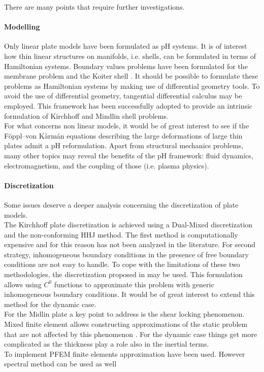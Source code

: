There are many points that require further investigations.


\paragraph{Modelling}
Only linear plate models have been formulated as pH systems. It is of interest how thin linear structures on manifolds, i.e. shells, can be formulated in terms of Hamiltonian systems. Boundary values problems have been formulated for the membrane problem and the Koiter shell \cite{ciarlet2000shells}. It should be possible to formulate these problems as Hamiltonian systems by making use of differential geometry tools. To avoid the use of differential geometry, tangential differential calculus \cite{delfour2011shapes} may be employed. This framework has been successfully adopted to provide an intrinsic formulation of Kirchhoff \cite{schollhammer2019kirchhoff} and Mindlin \cite{schollhammer2019reissner} shell problems. \\
For what concerns non linear models, it would be of great interest to see if the F\"oppl–von K\`arm\'an equations describing the large deformations of large thin plates \cite{bilbao2015conservative} admit a pH reformulation. Apart from structural mechanics problems, many other topics may reveal the benefits of the pH framework: fluid dynamics, electromagnetism, and the coupling of those (i.e. plasma physics).


\paragraph{Discretization}
Some issues deserve a deeper analysis concerning the discretization of plate models. \\
The Kirchhoff plate discretization is achieved using a Dual-Mixed discretization and the non-conforming HHJ method. The first method is computationally expensive and for this reason has not been analyzed in the literature. For second strategy, inhomogeneous boundary conditions in the presence of free boundary conditions are not easy to handle. To cope with the limitations of these two methodologies, the discretization proposed in \cite{rafetseder2018siam} may be used.  This formulation allows using $C^0$ functions to approximate this problem with generic inhomogeneous boundary conditions. It would be of great interest to extend this method for the dynamic case. \\ For the Midlin plate a key point to address is the shear locking phenomenon. Mixed finite element allows constructing approximations of the static problem that are not affected by this phenomenon \cite{veiga2013}. For the dynamic case things get more complicated as the thickness play a role also in the inertial terms. \\
To implement PFEM finite elements approximation have been used. However spectral method can be used as well

